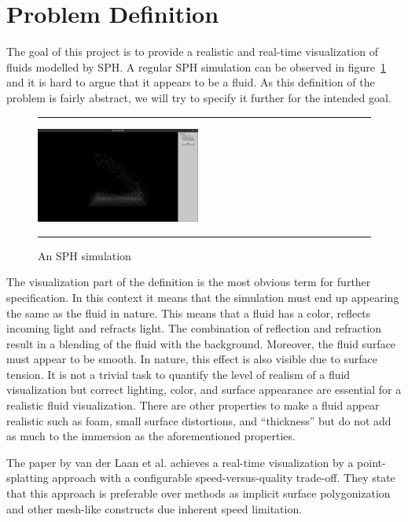 \section{Problem Definition}
The goal of this project is to provide a realistic and real-time visualization of fluids modelled by SPH.
A regular SPH simulation can be observed in figure~\ref{fig:sph} and it is hard to argue that it appears to be a fluid.
As this definition of the problem is fairly abstract, we will try to specify it further for the intended goal.

\begin{figure}[!th]
\hrule
\begin{center}
\vspace*{2ex}\includegraphics[width=0.48\textwidth,clip=true,trim=10cm 3cm 10cm 3cm]{pictures/sph.png}
\end{center}
\caption{An SPH simulation}
\label{fig:sph} 
\vspace*{2ex}
\hrule
\end{figure}
The visualization part of the definition is the most obvious term for further specification. 
In this context it means that the simulation must end up appearing the same as the fluid in nature.
This means that a fluid has a color, reflects incoming light and refracts light.
The combination of reflection and refraction result in a blending of the fluid with the background.
Moreover, the fluid surface must appear to be smooth.
In nature, this effect is also visible due to surface tension.
It is not a trivial task to quantify the level of realism of a fluid visualization but correct lighting, color, and surface appearance are essential for a realistic fluid visualization.
There are other properties to make a fluid appear realistic such as foam, small surface distortions, and ``thickness'' but do not add as much to the immersion as the aforementioned properties.

The paper by van der Laan et al. \cite{van2009screen} achieves a real-time visualization by a point-splatting approach with a configurable speed-versus-quality trade-off.
They state that this approach is preferable over methods as implicit surface polygonization and other mesh-like constructs due inherent speed limitation.

